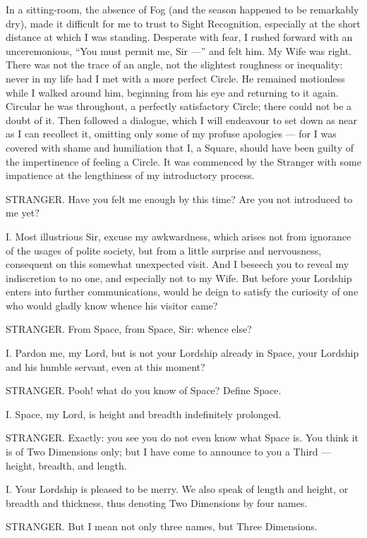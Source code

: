 \documentclass[12pt, a4paper, oneside]{memoir}
\begin{document}
In a sitting-room, the absence of Fog (and the season happened to be
remarkably dry), made it difficult for me to trust to Sight Recognition,
especially at the short distance at which I was standing. Desperate with fear,
I rushed forward with an unceremonious, ``You must permit me, Sir ---'' and felt
him. My Wife was right. There was not the trace of an angle, not the slightest
roughness or inequality: never in my life had I met with a more perfect
Circle. He remained motionless while I walked around him, beginning from his
eye and returning to it again. Circular he was throughout, a perfectly
satisfactory Circle; there could not be a doubt of it. Then followed a
dialogue, which I will endeavour to set down as near as I can recollect it,
omitting only some of my profuse apologies --- for I was covered with shame and
humiliation that I, a Square, should have been guilty of the impertinence of
feeling a Circle. It was commenced by the Stranger with some impatience at the
lengthiness of my introductory process.

STRANGER. Have you felt me enough by this time? Are you not introduced to me
yet?

I. Most illustrious Sir, excuse my awkwardness, which arises not from
ignorance of the usages of polite society, but from a little surprise and
nervousness, consequent on this somewhat unexpected visit. And I beseech you
to reveal my indiscretion to no one, and especially not to my Wife. But before
your Lordship enters into further communications, would he deign to satisfy
the curiosity of one who would gladly know whence his visitor came?

STRANGER. From Space, from Space, Sir: whence else?

I. Pardon me, my Lord, but is not your Lordship already in Space, your
Lordship and his humble servant, even at this moment?

STRANGER. Pooh! what do you know of Space? Define Space.

I. Space, my Lord, is height and breadth indefinitely prolonged.

STRANGER. Exactly: you see you do not even know what Space is. You think it is
of Two Dimensions only; but I have come to announce to you a Third --- height,
breadth, and length.

I. Your Lordship is pleased to be merry. We also speak of length and height,
or breadth and thickness, thus denoting Two Dimensions by four names.

STRANGER. But I mean not only three names, but Three Dimensions.
\end{document}
